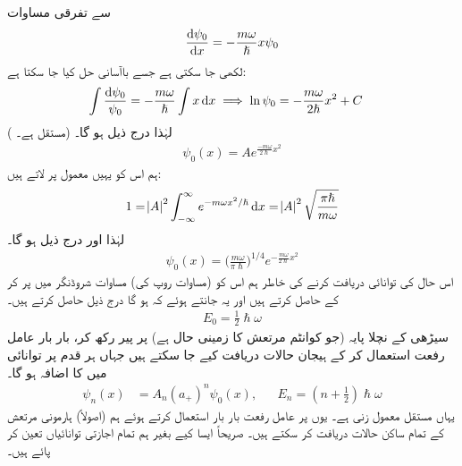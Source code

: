 سے تفرقی مساوات
\begin{align*}
\frac{ \dif \psi_0}{\dif x } = -\frac{m \omega }{ \hslash } x \psi_0
\end{align*}
لکھی جا سکتی ہے جسے باآسانی حل کیا جا سکتا ہے: 
\begin{align*}
\int{\frac{ \dif \psi_0 }{ \psi_0 } } &= -\frac{ m \omega }{ \hslash } \int{ x \dif x } \implies \ln \psi_0 = 
-\frac{m \omega }{ 2 \hslash } x^2 +C 
\end{align*} 
( مستقل ہے۔) لہٰذا درج ذیل ہو گا۔
\begin{align*}
\psi_0 (x) = A e^{\frac{ - m \omega }{ 2 \hslash } x^2}
\end{align*}
ہم اس کو یہیں معمول پر لاتے ہیں: 
\begin{align*}
1 = \abs{A}^2 \int_{ - \infty}^{ \infty } e^{- m \omega x^2/ \hslash} \dif x = \abs{A}^2 \sqrt{ \frac{ \pi \hslash }{ m \omega }}
\end{align*}
لہٰذا  اور درج ذیل ہو گا۔
\\
\begin{align}\label{مساوات_شروڈنگر_معمول_شدہ_حال_صفر}
\psi_0 (x) = \big(\frac{ m \omega }{ \pi \hslash}\big)^{1/4} e^{-\frac{ m \omega }{ 2 \hslash} x^2}
\end{align}
اس حال کی توانائی دریافت کرنے کی خاطر ہم اس کو (مساوات  روپ کی) مساوات شروڈنگر میں پر کر کے  حاصل کرتے ہیں اور یہ جانتے ہوئے کہ  ہو گا درج ذیل حاصل کرتے ہیں۔
\begin{align}
 E_0 = \frac{1}{2} \hslash \omega 
\end{align}
سیڑھی کے نچلا پایہ (جو کوانٹم مرتعش کا زمینی حال ہے) پر پیر رکھ کر، بار بار عامل رفعت استعمال کر کے ہیجان حالات دریافت کیے جا سکتے ہیں جہاں ہر قدم پر توانائی میں  کا اضافہ ہو گا۔
\begin{align}\label{مساوات_شروڈنگر_ہارمونی_حالات}
\psi_n (x) &= A_n ( a_+)^n \psi_0(x) , && E_n = ( n + \tfrac{1}{2}) \hslash \omega
\end{align}
یہاں  مستقل معمول زنی ہے۔ یوں  پر عامل رفعت بار بار استعمال کرتے ہوئے ہم (اصولاً) ہارمونی مرتعش کے تمام ساکن حالات دریافت کر سکتے ہیں۔ صریحاً ایسا کیے بغیر ہم تمام اجازتی توانائیاں تعین کر پائے ہیں۔


